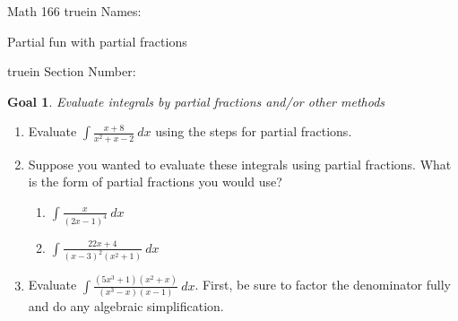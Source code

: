 \documentclass[12pt]{article}
\newtheorem*{goal}{Goal}
\begin{document}
\pagestyle{empty} %

\noindent
{Math 166  truein  Names:\ \hrulefill}

\noindent
{Partial fun with partial fractions}

\noindent  {} truein  Section Number:\ \hrulefill
\medskip

\begin{goal} \rm
Evaluate integrals by partial fractions and/or other methods
\end{goal}

\begin{enumerate}


\item Evaluate $\displaystyle\int\frac{x+8}{x^2+x-2} \  dx$ using the steps for partial fractions.
\vfill
\vfill\vfill\vfill
\item Suppose you wanted to evaluate these integrals using partial fractions. What is the form of partial fractions you would use? 
\begin{enumerate}
\item $\displaystyle\int  \displaystyle\frac{x}{(2x-1)^{4}} \ dx$

\vfill

\item $\displaystyle\int  \displaystyle\frac{22x+4}{(x-3)^2(x^2+1)} \ dx$
\vfill
\end{enumerate}






\vspace{2.75in}

\vspace{2.75in}
\item Evaluate  $\displaystyle\int  \displaystyle\frac{(5x^3+1)(x^2+x)}{(x^3-x)(x-1)} \ dx$. First, be sure to factor the denominator fully and do any algebraic simplification. 



\end{enumerate}
\end{document}
